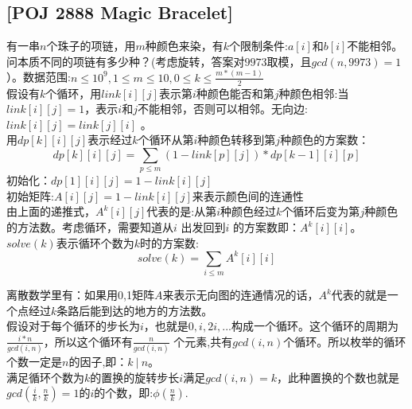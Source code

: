 \subsection {[POJ 2888 Magic Bracelet]}

有一串$n$个珠子的项链，用$m$种颜色来染，有$k$个限制条件:$a[i]$和$b[i]$不能相邻。问本质不同的项链有多少种？(考虑旋转，答案对$9973$取模，且$gcd(n,9973)=1$）。数据范围:$n\leq 10^9,1\leq m \leq 10,0 \leq k \leq \frac{m*(m-1)}{2}$ \\

假设有$k$个循环，用$link[i][j]$表示第$i$种颜色能否和第$j$种颜色相邻:当$link[i][j]=1$，表示$i$和$j$不能相邻，否则可以相邻。无向边:$link[i][j]=link[j][i]$ 。 \\
用$dp[k][i][j]$表示经过$k$个循环从第$i$种颜色转移到第$j$种颜色的方案数： \\
$$dp[k][i][j]=\sum_{p\leq m}(1-link[p][j])*dp[k-1][i][p]$$
初始化：$dp[1][i][j] = 1-link[i][j]$ \\
初始矩阵:$A[i][j]=1-link[i][j]$来表示颜色间的连通性 \\
由上面的递推式，$A^k[i][j]$代表的是:从第$i$种颜色经过$k$个循环后变为第$j$种颜色的方法数。考虑循环，需要知道从$i$ 出发回到$i$ 的方案数即：$A^{k}[i][i]$。$solve(k)$表示循环个数为$k$时的方案数: \\
$$solve(k)=\sum_{i\leq m}A^{k}[i][i]$$

离散数学里有：如果用0,1矩阵$A$来表示无向图的连通情况的话，$A^k$代表的就是一个点经过$k$条路后能到达的地方的方法数。\\

假设对于每个循环的步长为$i$，也就是$0,i,2i,...$构成一个循环。这个循环的周期为$\frac{i*n}{gcd(i,n)}$，所以这个循环有$\frac{n}{gcd(i,n)}$ 个元素,共有$gcd(i,n)$个循环。所以枚举的循环个数一定是$n$的因子,即：$k \ |\ n$。\\
满足循环个数为$k$的置换的旋转步长$i$满足$gcd(i,n)=k$，此种置换的个数也就是$gcd(\frac{i}{k},\frac{n}{k})=1$的$i$的个数，即:$\phi(\frac{n}{k})$.\\

